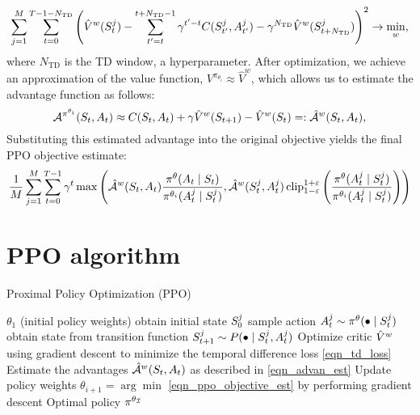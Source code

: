 \documentclass[12pt,twoside]{../../mitthesis}
\begin{document}
\begin{equation}
    \label{eqn_td_loss}
    \sum_{j=1}^M\sum_{t=0}^{T-1 - N_{\text{TD}}}\left(\hat{V}^w(S_t^j) - \sum_{t'=t}^{t + N_{\text{TD}} - 1} \gamma^{t'-t}C(S_{t'}^j, A_{t'}^j) - \gamma^{N_{\text{TD}}}\hat{V}^w(S_{t + N_{\text{TD}}}^j)\right)^2 \rightarrow \min_{w},
\end{equation}
where $N_{\text{TD}}$ is the TD window, a hyperparameter.
After optimization, we achieve an approximation of the value function, $V^{\pi_{\theta_i}} \approx \hat{V}^w$, which allows us to estimate the advantage function as follows: 
\begin{equation}
    \label{eqn_advan_est}
    \mathcal A^{\pi^{\theta_i}}(S_t, A_t) \approx C(S_t, A_t) + \gamma \hat{V}^w(S_{t+1}) - \hat{V}^w(S_t) =: \hat{\mathcal A}^{w}(S_t, A_t) ,
\end{equation}
Substituting this estimated advantage into the original objective yields the final PPO objective estimate:
\begin{equation}
    \label{eqn_ppo_objective_est}
    \frac{1}{M} \sum_{j = 1}^M \sum_{t=0}^{T-1} \gamma ^ t \max\left(\hat{\mathcal A}^{w}(S_t, A_t)   \frac{\pi^{\theta}(A_t \mid S_t)}{\pi^{\theta_i}(A_t^j \mid S_t^j)}, \hat{\mathcal A}^{w}(S_t^j, A_t^j) \operatorname{clip}_{1 - \varepsilon}^{1 + \varepsilon}\left(\frac{\pi^{\theta}(A_t^j \mid S_t^j)}{\pi^{\theta_i}(A_t^j \mid S_t^j)}\right) \right)
\end{equation}

\section*{PPO algorithm}
\begin{algorithm}
    \caption{Proximal Policy Optimization (PPO)}
    \label{alg:my-alg}
    \begin{algorithmic}[1]
     $\theta_1$ (initial policy weights)
            \STATE obtain initial state $S_0^{j}$
                \STATE sample action $A_t^j \sim \pi^{\theta}(\bullet \mid S_t^{j})$
                \STATE obtain state from transition function $S_{t+1}^j \sim P(\bullet \mid S_t^j, A_t^j)$
            \ENDFOR
        \ENDFOR
        \STATE Optimize critic $\hat{V}^{w}$ using gradient descent to minimize the temporal difference loss \eqref{eqn_td_loss}
        \STATE Estimate the advantages $\hat{\mathcal A}^{w}(S_t, A_t)$ as described in \eqref{eqn_advan_est} 
        \STATE Update policy weights $\theta_{i + 1} = \arg\min$ \eqref{eqn_ppo_objective_est} by performing gradient descent 
    \ENDFOR
    \STATE \RETURN Optimal policy $\pi^{\theta_{\mathcal I}}$
    \end{algorithmic}
\end{algorithm}
\end{document}
